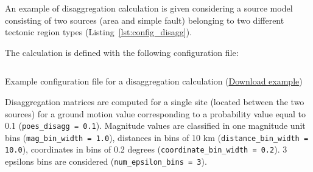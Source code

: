 An example of disaggregation calculation is given considering a source model
consisting of two sources (area and simple fault) belonging to two different
tectonic region types (Listing~\ref{lst:config_disagg}).

The calculation is defined with the following configuration file:

\begin{listing}[htbp]
  \inputminted[firstline=1,firstnumber=1,fontsize=\footnotesize,frame=single,linenos,bgcolor=lightgray,label=job.ini]{ini}{oqum/risk/verbatim/config_disagg.ini}
  \caption{Example configuration file for a disaggregation calculation (\href{https://raw.githubusercontent.com/gem/oq-engine/master/doc/manual/oqum/risk/verbatim/config_disagg.ini}{Download example})}
  \label{lst:config_disagg}
\end{listing}

Disaggregation matrices are computed for a single site (located between the
two sources) for a ground motion value corresponding to a probability value
equal to 0.1 (\texttt{poes\_\-disagg = 0.1}). Magnitude values are classified
in one magnitude unit bins (\texttt{mag\_\-bin\_\-width = 1.0}), distances in
bins of 10 km (\texttt{distance\_\-bin\_\-width = 10.0}), coordinates in bins
of 0.2 degrees (\texttt{coordinate\_\-bin\_\-width = 0.2}). 3 epsilons bins
are considered (\texttt{num\_\-epsilon\_\-bins = 3}).
